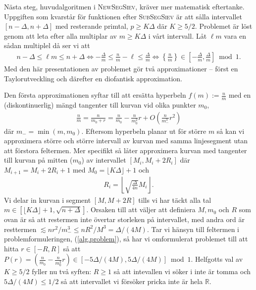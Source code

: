 
Nästa steg, huvudalgoritmen i \textsc{NewSegSiev}, kräver mer matematisk eftertanke. Uppgiften som kvarstår för funktionen efter \textsc{SubSegSiev} är att sålla intervallet \([n - \Delta, n + \Delta]\) med resterande primtal, \( p \geq K \Delta\) där \(K \geq 5/2\). Problemet är löst genom att leta efter alla multiplar av \(m \geq K \Delta\) i vårt intervall. Låt \(\ell m\) vara en sådan multiplel då ser vi att
\begin{align} \label{alg.problem}
    n - \Delta \leq \ell m \leq n + \Delta \Longleftrightarrow - \frac{\Delta}{m} \leq \frac{n}{m} - \ell \leq \frac{\Delta}{m} \Longleftrightarrow \left\{ \frac{n}{m} \right\} \in \left[- \frac{\Delta}{m}, \frac{\Delta}{m} \right] \bmod 1.
\end{align}
Med den här presentationen av problemet gör \cite{HaraldSieve} två approximationer -- först en Taylorutveckling och därefter en diofantisk approximation. 

Den första approximationen syftar till att ersätta hyperbeln \(f(m) := \frac{n}{m}\) med en (diskontinuerlig) mängd tangenter till kurvan vid olika punkter \(m_0\),
\begin{align*}
    \frac{n}{m} = \frac{n}{m_0 + r} = \frac{n}{m_0} - \frac{n}{m_0^2} r + O\left(\frac{n}{m_-^3} r^2 \right)
\end{align*} %
där \(m_- = \min(m, m_0)\). Eftersom hyperbeln planar ut för större $m$ så kan vi approximera större och större intervall av kurvan med samma linjesegment utan att förstora feltermen. Mer specifikt så låter \cite{HaraldSieve} approximera kurvan med tangenter till kurvan på mitten ($m_0$) av intervallet \([M_i, M_i + 2R_i]\) där  $M_{i + 1} = M_i + 2R_i + 1$ med $M_0 = \lfloor K \Delta \rfloor + 1$ och
\begin{align*}
    R_i = \left\lfloor \sqrt{\frac{\Delta}{4n}} M_i \right\rfloor .
\end{align*}
Vi delar in kurvan i segment \([M, M + 2R]\) tills vi har täckt alla tal \(m \in [  \lfloor K \Delta \rfloor + 1, \sqrt{n + \Delta}]\). Orsaken till att \cite{HaraldSieve} väljer att definiera \(M, m_0\) och \(R\) som ovan är så att restermen inte övertar storleken på intervallet, med andra ord är resttermen \(\lesssim nr^2/m_-^3 \leq nR^2/M^3 = \Delta / (4M)\). Tar vi hänsyn till feltermen i problemformuleringen, (\ref{alg.problem}), så har vi omformulerat problemet till att hitta \(r \in [-R, R]\) så att \(P(r) = (\frac{n}{m_0} - \frac{n}{m_0^2} r) \in [-5\Delta/(4M), 5\Delta/(4M)] \bmod{1}\). Helfgotts val av \(K \geq 5/2\) fyller nu två syften: \(R \geq 1\) så att intevallen vi söker i inte är tomma och \(5\Delta/(4M) \leq 1/2\) så att intervallet vi försöker pricka inte är hela \(\mathbb{R}\).


